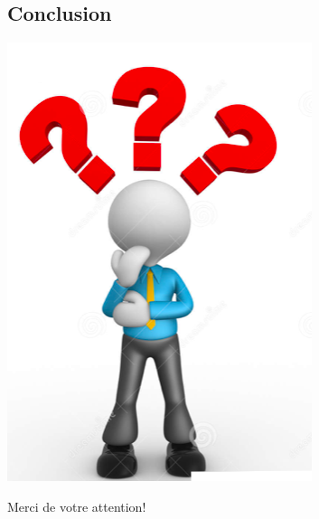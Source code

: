 \begin{frame}
\section{Conclusion}
\end{frame}
{\includegraphics[width=\paperwidth,height=\paperheight,keepaspectratio]{images/Capture d’écran 2022-09-05 à 15.52.20.png}}
{
\begin{frame}

    \begin{center} 
        \Huge Merci de votre attention!
   \end{center}
\end{frame}
}